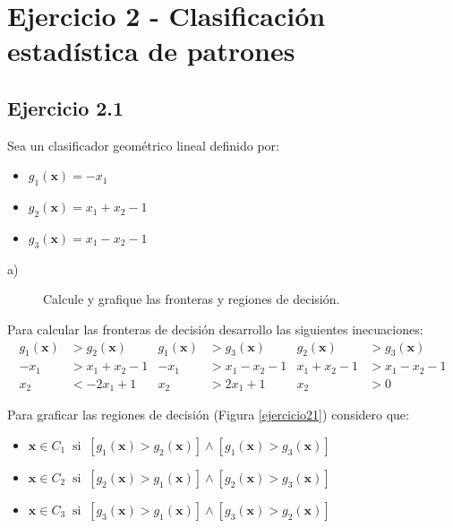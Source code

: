 \documentclass[11pt,a4paper,final]{article}
\begin{document}
\clearpage



\section{Ejercicio 2 - Clasificación estadística de patrones}

\subsection{Ejercicio 2.1}

Sea un clasificador geométrico lineal definido por:
\begin{itemize}
\item $g_1(\mathbf{x}) = - x_1$ 
\item $g_2(\mathbf{x}) = x_1 + x_2 - 1$
\item $g_3(\mathbf{x}) = x_1 - x_2 - 1$
\end{itemize}

\begin{description}
\item[a)] Calcule y grafique las fronteras y regiones de decisión.
\end{description}

Para calcular las fronteras de decisión desarrollo las siguientes inecuaciones:
\begin{align*}
g_1(\mathbf{x}) &> g_2(\mathbf{x})   &  g_1(\mathbf{x}) &> g_3(\mathbf{x})  &  g_2(\mathbf{x}) &> g_3(\mathbf{x}) \\
- x_1           &> x_1 + x_2 - 1     &  - x_1           &> x_1 - x_2 - 1    &  x_1 + x_2 - 1   &> x_1 - x_2 - 1   \\
  x_2           &< - 2 x_1 + 1       &  x_2             &> 2 x_1 + 1        &  x_2             &> 0
\end{align*}

Para graficar las regiones de decisión (Figura \ref{ejercicio21}) considero que:
\begin{itemize}
\item $\mathbf{x} \in C_1 \;\; \mathrm{si} \;\; [g_1(\mathbf{x}) > g_2(\mathbf{x})] \wedge  [g_1(\mathbf{x}) > g_3(\mathbf{x})]$

\item $\mathbf{x} \in C_2 \;\; \mathrm{si} \;\; [g_2(\mathbf{x}) > g_1(\mathbf{x})] \wedge  [g_2(\mathbf{x}) > g_3(\mathbf{x})]$

\item $\mathbf{x} \in C_3 \;\; \mathrm{si} \;\; [g_3(\mathbf{x}) > g_1(\mathbf{x})] \wedge  [g_3(\mathbf{x}) > g_2(\mathbf{x})]$
\end{itemize}
\end{document}
